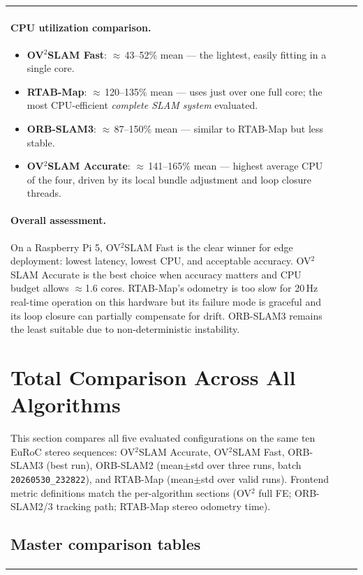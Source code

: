 \documentclass[11pt]{article}
\begin{document}
\begin{table}[ht]
\begin{tabular}{p{3.2cm}p{5.2cm}p{5.2cm}}
\paragraph{CPU utilization comparison.}
\begin{itemize}
    \item \textbf{OV$^2$SLAM Fast}: $\approx$\,43--52\% mean — the lightest, easily fitting in a single core.
    \item \textbf{RTAB-Map}: $\approx$\,120--135\% mean — uses just over one full core; the most CPU-efficient \emph{complete SLAM system} evaluated.
    \item \textbf{ORB-SLAM3}: $\approx$\,87--150\% mean — similar to RTAB-Map but less stable.
    \item \textbf{OV$^2$SLAM Accurate}: $\approx$\,141--165\% mean — highest average CPU of the four, driven by its local bundle adjustment and loop closure threads.
\end{itemize}

\paragraph{Overall assessment.} On a Raspberry Pi 5, OV$^2$SLAM Fast is the clear winner for edge deployment: lowest latency, lowest CPU, and acceptable accuracy. OV$^2$SLAM Accurate is the best choice when accuracy matters and CPU budget allows $\approx$1.6 cores. RTAB-Map's odometry is too slow for 20\,Hz real-time operation on this hardware but its failure mode is graceful and its loop closure can partially compensate for drift. ORB-SLAM3 remains the least suitable due to non-deterministic instability.


\clearpage

\section{Total Comparison Across All Algorithms}
\label{sec:total_comparison}

This section compares all five evaluated configurations on the same ten EuRoC stereo sequences: OV$^2$SLAM Accurate, OV$^2$SLAM Fast, ORB-SLAM3 (best run), ORB-SLAM2 (mean$\pm$std over three runs, batch \texttt{20260530\_232822}), and RTAB-Map (mean$\pm$std over valid runs). Frontend metric definitions match the per-algorithm sections (OV$^2$ full FE; ORB-SLAM2/3 tracking path; RTAB-Map stereo odometry time).

\subsection{Master comparison tables}


\end{tabular}
\end{table}
\end{document}
